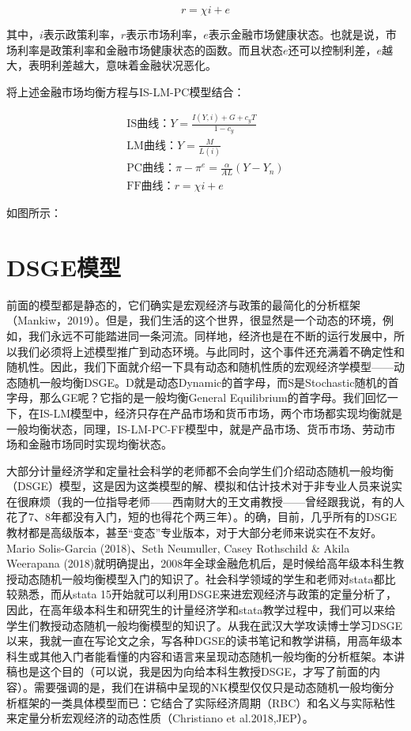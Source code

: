 \documentclass[cn,12pt,math=newtx,citestyle=gb7714-2015,bibstyle=gb7714-2015]{elegantbook}
\begin{document}
	\begin{equation}
		r = \chi i +e
	\end{equation}

其中，$i$表示政策利率，$r$表示市场利率，$e$表示金融市场健康状态。也就是说，市场利率是政策利率和金融市场健康状态的函数。而且状态$e$还可以控制利差，$e$越大，表明利差越大，意味着金融状况恶化。

将上述金融市场均衡方程与IS-LM-PC模型结合：

	\begin{equation}
	\begin{array}{l}
		\text{IS曲线：}   Y = \frac{I(Y,i)+G+c_y T}{1-c_y}\\
		\text{LM曲线：}     Y=\frac{M}{L(i)}\\
		\text{PC曲线：}   \pi -\pi^e = \frac{\alpha}{ AL} (Y -Y_n)\\
			\text{FF曲线：}    r = \chi i +e
	\end{array}
\end{equation}


如图所示：

	
	
	\section{DSGE模型}
	
	前面的模型都是静态的，它们确实是宏观经济与政策的最简化的分析框架（Mankiw，2019）。但是，我们生活的这个世界，很显然是一个动态的环境，例如，我们永远不可能踏进同一条河流。同样地，经济也是在不断的运行发展中，所以我们必须将上述模型推广到动态环境。与此同时，这个事件还充满着不确定性和随机性。因此，我们下面就介绍一下具有动态和随机性质的宏观经济学模型——动态随机一般均衡DSGE。D就是动态Dynamic的首字母，而S是Stochastic随机的首字母，那么GE呢？它指的是一般均衡General Equilibrium的首字母。我们回忆一下，在IS-LM模型中，经济只存在产品市场和货币市场，两个市场都实现均衡就是一般均衡状态，同理，IS-LM-PC-FF模型中，就是产品市场、货币市场、劳动市场和金融市场同时实现均衡状态。
	
	大部分计量经济学和定量社会科学的老师都不会向学生们介绍动态随机一般均衡（DSGE）模型，这是因为这类模型的解、模拟和估计技术对于非专业人员来说实在很麻烦（我的一位指导老师——西南财大的王文甫教授——曾经跟我说，有的人花了7、8年都没有入门，短的也得花个两三年）。的确，目前，几乎所有的DSGE教材都是高级版本，甚至“变态”专业版本，对于大部分老师来说实在不友好。Mario Solis-Garcia (2018)、Seth Neumuller, Casey Rothschild \& Akila Weerapana (2018)就明确提出，2008年全球金融危机后，是时候给高年级本科生教授动态随机一般均衡模型入门的知识了。社会科学领域的学生和老师对stata都比较熟悉，而从stata 15开始就可以利用DSGE来进宏观经济与政策的定量分析了，因此，在高年级本科生和研究生的计量经济学和stata教学过程中，我们可以来给学生们教授动态随机一般均衡模型的知识了。从我在武汉大学攻读博士学习DSGE以来，我就一直在写论文之余，写各种DGSE的读书笔记和教学讲稿，用高年级本科生或其他入门者能看懂的内容和语言来呈现动态随机一般均衡的分析框架。本讲稿也是这个目的（可以说，我是因为向给本科生教授DSGE，才写了前面的内容）。需要强调的是，我们在讲稿中呈现的NK模型仅仅只是动态随机一般均衡分析框架的一类具体模型而已：它结合了实际经济周期（RBC）和名义与实际粘性来定量分析宏观经济的动态性质（Christiano et al.2018,JEP）。
	
\end{document}

